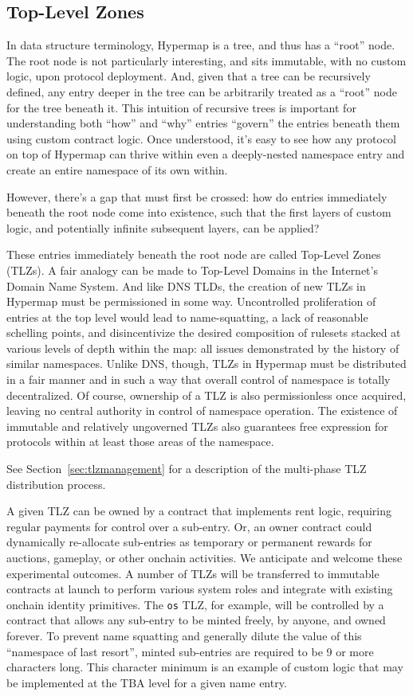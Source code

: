 \documentclass[runningheads]{llncs}
\begin{document}
\subsection{Top-Level Zones}
\label{sec:tlz}

In data structure terminology, Hypermap is a tree, and thus has a ``root'' node.
The root node is not particularly interesting, and sits immutable, with no custom logic, upon protocol deployment.
And, given that a tree can be recursively defined, any entry deeper in the tree can be arbitrarily treated as a ``root'' node for the tree beneath it.
This intuition of recursive trees is important for understanding both ``how'' and ``why'' entries ``govern'' the entries beneath them using custom contract logic.
Once understood, it's easy to see how any protocol on top of Hypermap can thrive within even a deeply-nested namespace entry and create an entire namespace of its own within.

However, there's a gap that must first be crossed: how do entries immediately beneath the root node come into existence, such that the first layers of custom logic, and potentially infinite subsequent layers, can be applied?

These entries immediately beneath the root node are called Top-Level Zones (TLZs).
A fair analogy can be made to Top-Level Domains in the Internet's Domain Name System.
And like DNS TLDs, the creation of new TLZs in Hypermap must be permissioned in some way.
Uncontrolled proliferation of entries at the top level would lead to name-squatting, a lack of reasonable schelling points, and disincentivize the desired composition of rulesets stacked at various levels of depth within the map: all issues demonstrated by the history of similar namespaces.
Unlike DNS, though, TLZs in Hypermap must be distributed in a fair manner and in such a way that overall control of namespace is totally decentralized.
Of course, ownership of a TLZ is also permissionless once acquired, leaving no central authority in control of namespace operation.
The existence of immutable and relatively ungoverned TLZs also guarantees free expression for protocols within at least those areas of the namespace.

See Section~\ref{sec:tlzmanagement} for a description of the multi-phase TLZ distribution process.

A given TLZ can be owned by a contract that implements rent logic, requiring regular payments for control over a sub-entry.
Or, an owner contract could dynamically re-allocate sub-entries as temporary or permanent rewards for auctions, gameplay, or other onchain activities.
We anticipate and welcome these experimental outcomes.
A number of TLZs will be transferred to immutable contracts at launch to perform various system roles and integrate with existing onchain identity primitives.
The \verb|os| TLZ, for example, will be controlled by a contract that allows any sub-entry to be minted freely, by anyone, and owned forever.
To prevent name squatting and generally dilute the value of this ``namespace of last resort'', minted sub-entries are required to be 9 or more characters long.
This character minimum is an example of custom logic that may be implemented at the TBA level for a given name entry.
\end{document}
